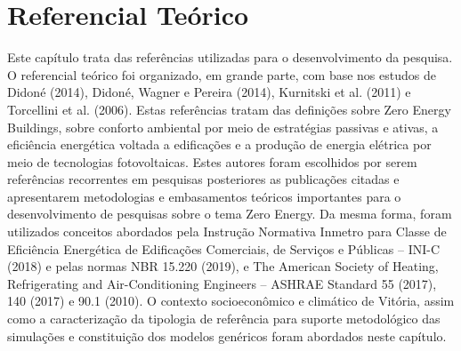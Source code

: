 \section{Referencial Teórico}
\begin{onehalfspace}
Este capítulo trata das referências utilizadas para o desenvolvimento da 
pesquisa. O referencial teórico foi organizado, em grande parte, com base 
nos estudos de Didoné (2014), Didoné, Wagner e  Pereira  (2014),  Kurnitski 
et al.  (2011)  e  Torcellini et al.  (2006).  Estas  referências  tratam  
das definições sobre Zero Energy Buildings, sobre conforto ambiental por 
meio de estratégias passivas e ativas, a eficiência energética voltada a 
edificações e a produção de energia elétrica por meio de tecnologias 
fotovoltaicas. Estes autores foram escolhidos por serem referências 
recorrentes em pesquisas posteriores as publicações citadas e apresentarem 
metodologias e embasamentos teóricos importantes para o desenvolvimento de 
pesquisas sobre o tema Zero Energy. Da mesma forma, foram utilizados 
conceitos abordados pela Instrução Normativa Inmetro para Classe de 
Eficiência Energética de Edificações Comerciais, de Serviços e Públicas 
– INI-C (2018) e pelas  normas  NBR  15.220  (2019),  e The American 
Society of Heating, Refrigerating and Air-Conditioning 
Engineers – ASHRAE Standard 55 (2017), 140 (2017) e 90.1 (2010). 
O contexto socioeconômico e climático de Vitória, assim como a caracterização 
da tipologia de referência  para  suporte  metodológico  das  simulações  
e  constituição  dos  modelos  genéricos foram abordados neste capítulo.



\end{onehalfspace}